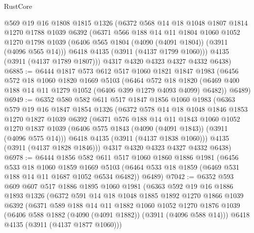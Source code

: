 \begin{lexlean}{RustCore}
\begin{coremodule}
      @569
      @19
      @16
      @1808
      @1815
      @1326
      (@6372
        @568
        @14
        @18
        @1048
        @1807
        @1814
        @1270
        @1788
        @1039
        @6392
        (@6371
          @566
          @188
          @14
          @11
          @1804
          @1060
          @1052
          @1270
          @1798
          @1039
          (@6406 @565 @1804 (@4090 (@4091 @1804)) (@3911 (@4096 @565 @14)))
          @6418
          @4135
          (@3911 (@4137 @1799 @1060)))
        @4135
        (@3911 (@4137 @1789 @1807)))
      @4317
      @4320
      @4323
      @4327
      @4332
      @6438)
@6885 := @6444
    @1817
    @573
    @612
    @517
    @1060
    @1821
    @1847
    @1983
    (@6456
      @572
      @18
      @1060
      @1820
      @1669
      @5103
      (@6464
        @572
        @18
        @1820
        (@6469 @400 @188 @14 @11 @1279 @1052 (@6406 @399 @1279 @4093 @4099) @6482))
      @6489)
@6949 := @6352
    @580
    @582
    @611
    @517
    @1847
    @1856
    @1060
    @1983
    (@6363
      @579
      @19
      @16
      @1847
      @1854
      @1326
      (@6372
        @578
        @14
        @18
        @1048
        @1846
        @1853
        @1270
        @1827
        @1039
        @6392
        (@6371
          @576
          @188
          @14
          @11
          @1843
          @1060
          @1052
          @1270
          @1837
          @1039
          (@6406 @575 @1843 (@4090 (@4091 @1843)) (@3911 (@4096 @575 @14)))
          @6418
          @4135
          (@3911 (@4137 @1838 @1060)))
        @4135
        (@3911 (@4137 @1828 @1846)))
      @4317
      @4320
      @4323
      @4327
      @4332
      @6438)
@6978 := @6444
    @1856
    @582
    @611
    @517
    @1060
    @1860
    @1886
    @1981
    (@6456
      @533
      @18
      @1060
      @1859
      @1669
      @5103
      (@6464 @533 @18 @1859 (@6469 @531 @188 @14 @11 @1687 @1052 @6534 @6482))
      @6489)
@7042 := @6352
    @593
    @609
    @607
    @517
    @1886
    @1895
    @1060
    @1981
    (@6363
      @592
      @19
      @16
      @1886
      @1893
      @1326
      (@6372
        @591
        @14
        @18
        @1048
        @1885
        @1892
        @1270
        @1866
        @1039
        @6392
        (@6371
          @589
          @188
          @14
          @11
          @1882
          @1060
          @1052
          @1270
          @1876
          @1039
          (@6406 @588 @1882 (@4090 (@4091 @1882)) (@3911 (@4096 @588 @14)))
          @6418
          @4135
          (@3911 (@4137 @1877 @1060)))

\end{coremodule}
\end{lexlean}

